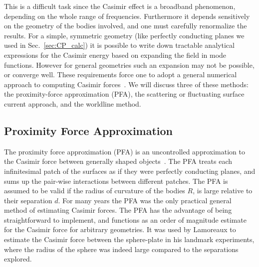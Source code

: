 This is a difficult task since the Casimir effect is a broadband phenomenon, depending on the whole 
range of frequencies.  Furthermore it depends sensitively on the geometry of the bodies involved, 
and one must carefully renormalize the results.  
For a simple, symmetric geometry (like perfectly conducting planes we used in Sec.~\ref{sec:CP_calc})
it is possible to write down tractable analytical expressions for
the Casimir energy based on expanding the field in mode functions.  However for general geometries 
such an expansion may not be possible, or converge well.
These requirements force one to adopt a general numerical approach to computing Casimir forces~\cite{Johnson2011}.
We will discuss three of these methods: the proximity-force approximation (PFA), the scattering
or fluctuating surface current approach, and the worldline method.




\subsection{Proximity Force Approximation}

The proximity force approximation (PFA) is an uncontrolled approximation to
the Casimir force between generally shaped objects~\cite{Derjaguin1956}.  
The PFA treats each infinitesimal patch of the surfaces as if they were perfectly conducting planes,
and sums up the pair-wise interactions between different patches.
The PFA is assumed to be valid if the radius of curvature of the bodies $R$, is large relative to 
their separation $d$.  
For many years the PFA was the only practical general method of estimating Casimir forces.
The PFA has the advantage of being straightforward to implement, and functions as an order of magnitude
estimate for the Casimir force for arbitrary geometries.
It was used by Lamoreaux to estimate the Casimir force between the sphere-plate
in his landmark experiments, where the radius of the sphere was indeed large compared to the separations explored. 

